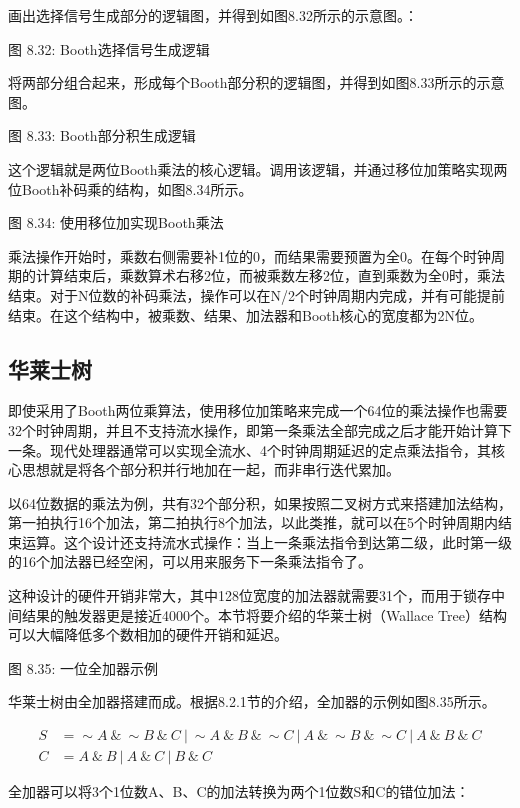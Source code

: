 \documentclass[]{ctexbook}
\begin{document}
画出选择信号生成部分的逻辑图，并得到如图8.32所示的示意图。：

图 8.32: Booth选择信号生成逻辑

将两部分组合起来，形成每个Booth部分积的逻辑图，并得到如图8.33所示的示意图。

图 8.33: Booth部分积生成逻辑

这个逻辑就是两位Booth乘法的核心逻辑。调用该逻辑，并通过移位加策略实现两位Booth补码乘的结构，如图8.34所示。

图 8.34: 使用移位加实现Booth乘法

乘法操作开始时，乘数右侧需要补1位的0，而结果需要预置为全0。在每个时钟周期的计算结束后，乘数算术右移2位，而被乘数左移2位，直到乘数为全0时，乘法结束。对于N位数的补码乘法，操作可以在N/2个时钟周期内完成，并有可能提前结束。在这个结构中，被乘数、结果、加法器和Booth核心的宽度都为2N位。

\hypertarget{ux534eux83b1ux58ebux6811}{%
\subsection{华莱士树}\label{ux534eux83b1ux58ebux6811}}

即使采用了Booth两位乘算法，使用移位加策略来完成一个64位的乘法操作也需要32个时钟周期，并且不支持流水操作，即第一条乘法全部完成之后才能开始计算下一条。现代处理器通常可以实现全流水、4个时钟周期延迟的定点乘法指令，其核心思想就是将各个部分积并行地加在一起，而非串行迭代累加。

以64位数据的乘法为例，共有32个部分积，如果按照二叉树方式来搭建加法结构，第一拍执行16个加法，第二拍执行8个加法，以此类推，就可以在5个时钟周期内结束运算。这个设计还支持流水式操作：当上一条乘法指令到达第二级，此时第一级的16个加法器已经空闲，可以用来服务下一条乘法指令了。

这种设计的硬件开销非常大，其中128位宽度的加法器就需要31个，而用于锁存中间结果的触发器更是接近4000个。本节将要介绍的华莱士树（Wallace Tree）结构可以大幅降低多个数相加的硬件开销和延迟。

图 8.35: 一位全加器示例

华莱士树由全加器搭建而成。根据8.2.1节的介绍，全加器的示例如图8.35所示。

\[\begin{aligned}S&=\sim A\ \&\ \sim B\ \&\ C\ |\ \sim A\ \&\ B\ \&\ \sim C\ |\ A\ \&\ \sim B\ \&\ \sim C\ |\ A\ \&\ B\ \&\ C \\ C&=A \ \&\ B\ |\ A\ \&\ C\ |\ B\ \&\ C\end{aligned}\]

全加器可以将3个1位数A、B、C的加法转换为两个1位数S和C的错位加法：
\end{document}
